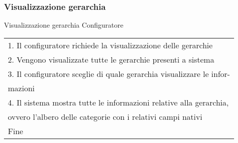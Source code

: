 \begin{minipage}{\textwidth}
    \subsubsection{Visualizzazione gerarchia}
    \usecase
        {Visualizzazione gerarchia}
        {
            Configuratore
        }
        {
            \begin{tabular}{l}
                1. Il configuratore richiede la visualizzazione delle gerarchie\\
                2. Vengono visualizzate tutte le gerarchie presenti a sistema\\
                3. Il configuratore sceglie di quale gerarchia visualizzare le infor-\\mazioni\\
                4. Il sistema mostra tutte le informazioni relative alla gerarchia,\\
                ovvero l'albero delle categorie con i relativi campi nativi\\
                Fine
            \end{tabular}\\


        }
        \vspace{0.5cm}
\end{minipage}